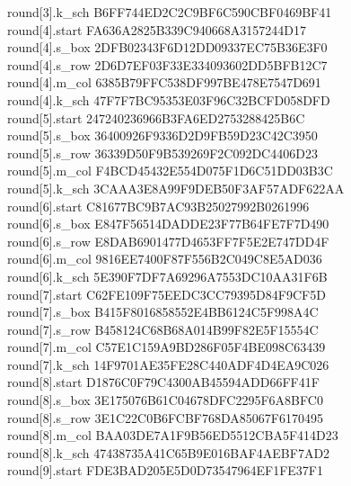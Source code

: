 \begin{tabbing}
  round[3].k\_sch \> B6FF744ED2C2C9BF6C590CBF0469BF41 \\
  round[4].start \> FA636A2825B339C940668A3157244D17 \\
  round[4].s\_box \> 2DFB02343F6D12DD09337EC75B36E3F0 \\
  round[4].s\_row \> 2D6D7EF03F33E334093602DD5BFB12C7 \\
  round[4].m\_col \> 6385B79FFC538DF997BE478E7547D691 \\
  round[4].k\_sch \> 47F7F7BC95353E03F96C32BCFD058DFD \\
  round[5].start \> 247240236966B3FA6ED2753288425B6C \\
  round[5].s\_box \> 36400926F9336D2D9FB59D23C42C3950 \\
  round[5].s\_row \> 36339D50F9B539269F2C092DC4406D23 \\
  round[5].m\_col \> F4BCD45432E554D075F1D6C51DD03B3C \\
  round[5].k\_sch \> 3CAAA3E8A99F9DEB50F3AF57ADF622AA \\
  round[6].start \> C81677BC9B7AC93B25027992B0261996 \\
  round[6].s\_box \> E847F56514DADDE23F77B64FE7F7D490 \\
  round[6].s\_row \> E8DAB6901477D4653FF7F5E2E747DD4F \\
  round[6].m\_col \> 9816EE7400F87F556B2C049C8E5AD036 \\
  round[6].k\_sch \> 5E390F7DF7A69296A7553DC10AA31F6B \\
  round[7].start \> C62FE109F75EEDC3CC79395D84F9CF5D \\
  round[7].s\_box \> B415F8016858552E4BB6124C5F998A4C \\
  round[7].s\_row \> B458124C68B68A014B99F82E5F15554C \\
  round[7].m\_col \> C57E1C159A9BD286F05F4BE098C63439 \\
  round[7].k\_sch \> 14F9701AE35FE28C440ADF4D4EA9C026 \\
  round[8].start \> D1876C0F79C4300AB45594ADD66FF41F \\
  round[8].s\_box \> 3E175076B61C04678DFC2295F6A8BFC0 \\
  round[8].s\_row \> 3E1C22C0B6FCBF768DA85067F6170495 \\
  round[8].m\_col \> BAA03DE7A1F9B56ED5512CBA5F414D23 \\
  round[8].k\_sch \> 47438735A41C65B9E016BAF4AEBF7AD2 \\
  round[9].start \> FDE3BAD205E5D0D73547964EF1FE37F1 \\

\end{tabbing}
